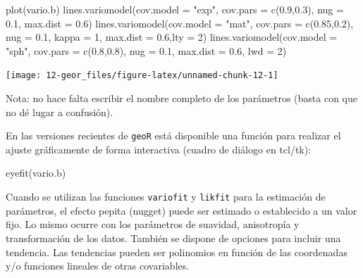 \documentclass[
  spanish,
]{book}
\newenvironment{Shaded}{\begin{snugshade}}{\end{snugshade}}
\newcommand{\AttributeTok}[1]{\textcolor[rgb]{0.77,0.63,0.00}{#1}}
\newcommand{\DecValTok}[1]{\textcolor[rgb]{0.00,0.00,0.81}{#1}}
\newcommand{\FloatTok}[1]{\textcolor[rgb]{0.00,0.00,0.81}{#1}}
\newcommand{\FunctionTok}[1]{\textcolor[rgb]{0.00,0.00,0.00}{#1}}
\newcommand{\NormalTok}[1]{#1}
\newcommand{\StringTok}[1]{\textcolor[rgb]{0.31,0.60,0.02}{#1}}
\theoremstyle{break}
\begin{document}
\begin{Shaded}
\begin{Highlighting}[]
\FunctionTok{plot}\NormalTok{(vario.b)}
\FunctionTok{lines.variomodel}\NormalTok{(}\AttributeTok{cov.model =} \StringTok{"exp"}\NormalTok{, }\AttributeTok{cov.pars =} \FunctionTok{c}\NormalTok{(}\FloatTok{0.9}\NormalTok{,}\FloatTok{0.3}\NormalTok{), }\AttributeTok{nug =} \FloatTok{0.1}\NormalTok{, }\AttributeTok{max.dist =} \FloatTok{0.6}\NormalTok{)}
\FunctionTok{lines.variomodel}\NormalTok{(}\AttributeTok{cov.model =} \StringTok{"mat"}\NormalTok{, }\AttributeTok{cov.pars =} \FunctionTok{c}\NormalTok{(}\FloatTok{0.85}\NormalTok{,}\FloatTok{0.2}\NormalTok{), }\AttributeTok{nug =} \FloatTok{0.1}\NormalTok{, }\AttributeTok{kappa =} \DecValTok{1}\NormalTok{, }\AttributeTok{max.dist =} \FloatTok{0.6}\NormalTok{,}\AttributeTok{lty =} \DecValTok{2}\NormalTok{)}
\FunctionTok{lines.variomodel}\NormalTok{(}\AttributeTok{cov.model =} \StringTok{"sph"}\NormalTok{, }\AttributeTok{cov.pars =} \FunctionTok{c}\NormalTok{(}\FloatTok{0.8}\NormalTok{,}\FloatTok{0.8}\NormalTok{), }\AttributeTok{nug =} \FloatTok{0.1}\NormalTok{, }\AttributeTok{max.dist =} \FloatTok{0.6}\NormalTok{, }\AttributeTok{lwd =} \DecValTok{2}\NormalTok{)}
\end{Highlighting}
\end{Shaded}

\begin{center}\texttt{[image: 12-geor\_files/figure-latex/unnamed-chunk-12-1]} \end{center}

Nota: no hace falta escribir el nombre completo de los parámetros
(basta con que no dé lugar a confusión).

En las versiones recientes de \texttt{geoR} está disponible una función para
realizar el ajuste gráficamente de forma interactiva
(cuadro de diálogo en tcl/tk):

\begin{Shaded}
\begin{Highlighting}[]
\FunctionTok{eyefit}\NormalTok{(vario.b)}
\end{Highlighting}
\end{Shaded}

Cuando se utilizan las funciones \texttt{variofit} y \texttt{likfit} para la
estimación de parámetros, el efecto pepita (nugget) puede ser estimado o
establecido a un valor fijo. Lo mismo ocurre con los parámetros de
suavidad, anisotropía y transformación de los datos. También se dispone
de opciones para incluir una tendencia. Las tendencias pueden ser
polinomios en función de las coordenadas y/o funciones lineales de otras
covariables.
\end{document}
